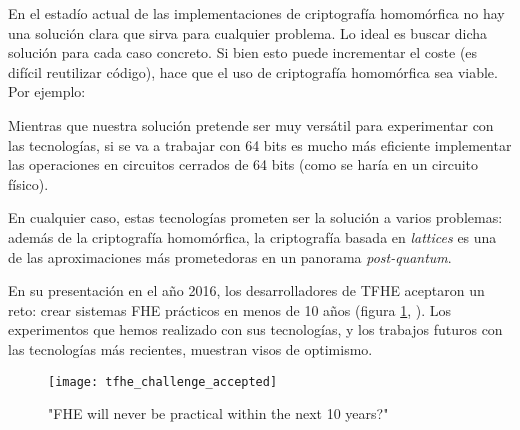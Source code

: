 En el estadío actual de las implementaciones de criptografía homomórfica no hay una solución clara que sirva para cualquier problema. Lo ideal es buscar dicha solución para cada caso concreto. Si bien esto puede incrementar el coste (es difícil reutilizar código), hace que el uso de criptografía homomórfica sea viable. Por ejemplo:

Mientras que nuestra solución pretende ser muy versátil para experimentar con las tecnologías, si se va a trabajar con 64 bits es mucho más eficiente implementar las operaciones en circuitos cerrados de 64 bits (como se haría en un circuito físico).

En cualquier caso, estas tecnologías prometen ser la solución a varios problemas: además de la criptografía homomórfica, la criptografía basada en \textit{lattices} es una de las aproximaciones más prometedoras en un panorama \textit{post-quantum}.

En su presentación en el año 2016, los desarrolladores de TFHE aceptaron un reto: crear sistemas FHE prácticos en menos de 10 años (figura \ref{fig:tfhe_challenge_accepted}, \cite{chillotti_tfhe:_2016}). Los experimentos que hemos realizado con sus tecnologías, y los trabajos futuros con las tecnologías más recientes, muestran visos de optimismo.

\begin{figure}[h]
    \centering
    \texttt{[image: tfhe\_challenge\_accepted]}
    \caption{"FHE will never be practical within the next 10 years?"}
    \label{fig:tfhe_challenge_accepted}
\end{figure}
 

